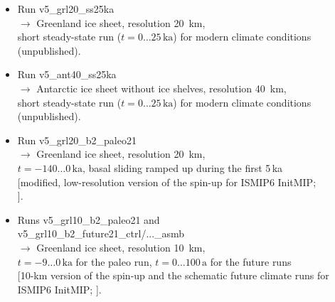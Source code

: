\documentclass[12pt,a4paper]{article}
\begin{document}
\begin{itemize}
\begin{itemize}
\item
Run v5\_grl20\_ss25ka
\\
$\longrightarrow$ Greenland ice sheet, resolution 20~km,
\\
\phantom{$\longrightarrow$} short steady-state run ($t=0\ldots{}25\,\mathrm{ka}$) for modern climate conditions
\\
\phantom{$\longrightarrow$} (unpublished).

\item
Run v5\_ant40\_ss25ka
\\
$\longrightarrow$ Antarctic ice sheet without ice shelves, resolution 40~km,
\\
\phantom{$\longrightarrow$} short steady-state run ($t=0\ldots{}25\,\mathrm{ka}$) for modern climate conditions
\\
\phantom{$\longrightarrow$} (unpublished).

\item
Run v5\_grl20\_b2\_paleo21
\\
$\longrightarrow$ Greenland ice sheet, resolution 20~km,
\\
\phantom{$\longrightarrow$} $t=-140\ldots{}0\,\mathrm{ka}$, basal sliding ramped up during the first 5\,ka
\\
\phantom{$\longrightarrow$} [modified, low-resolution version of the spin-up for ISMIP6 InitMIP; 
\\
\phantom{$\longrightarrow$} \citet{greve_etal_2017a}].

\item
Runs v5\_grl10\_b2\_paleo21 and
\\{}
\phantom{Runs} v5\_grl10\_b2\_future21\_ctrl/...\_asmb
\\
$\longrightarrow$ Greenland ice sheet, resolution 10~km,
\\
\phantom{$\longrightarrow$} $t=-9\ldots{}0\,\mathrm{ka}$ for the paleo run, $t=0\ldots{}100\,\mathrm{a}$ for the future runs
\\{}
\phantom{$\longrightarrow$} [10-km version of the spin-up and the schematic future climate runs for 
\\
\phantom{$\longrightarrow$} ISMIP6 InitMIP; \citet{greve_etal_2017a}].


\end{itemize}
\end{itemize}
\end{document}
